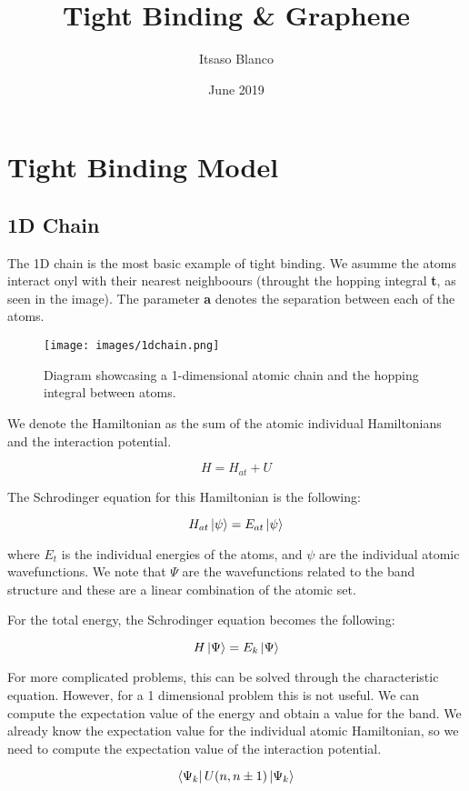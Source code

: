 \documentclass[a4paper,12pt]{report}
\title{Tight Binding & Graphene}
\author{Itsaso Blanco }
\date{June 2019}
\begin{document}
\newpage
\tableofcontents
\newpage

\chapter{Tight Binding Model}

\section{1D Chain}


The 1D chain is the most basic example of tight binding. We asumme the atoms interact onyl with their nearest neighboours (throught the hopping integral \textbf{t}, as seen in the image). The parameter \textbf{a} denotes the separation between each of the atoms. 

\begin{figure}[h]
	\begin{center}
		\texttt{[image: images/1dchain.png]}
	\end{center}
	\caption{Diagram showcasing a 1-dimensional atomic chain and the hopping integral between atoms.} 
	\label{fig:1dchaindiagram}
\end{figure}

We denote the Hamiltonian as the sum of the atomic individual Hamiltonians and the interaction potential. 

$$ H = H_{at} + U $$

The Schrodinger equation for this Hamiltonian is the following:

$$ H_{at} \ket{\psi} = E_{at} \ket{\psi} $$

where $ E_{t} $ is the individual energies of the atoms, and $\psi$ are the individual atomic wavefunctions. We note that $\Psi$ are the wavefunctions related to the band structure and these are a linear combination of the atomic set. 

For the total energy, the Schrodinger equation becomes the following:

$$ H \ket{\Psi} = E_k \ket{\Psi} $$

For more complicated problems, this can be solved through the characteristic equation. However, for a 1 dimensional problem this is not useful. We can compute the expectation value of the energy and obtain a value for the band. We already know the expectation value for the individual atomic Hamiltonian, so we need to compute the expectation value of the interaction potential. 

$$ \bra{\Psi_k} U (n, n \pm 1) \ket{\Psi_k} $$
\end{document}
